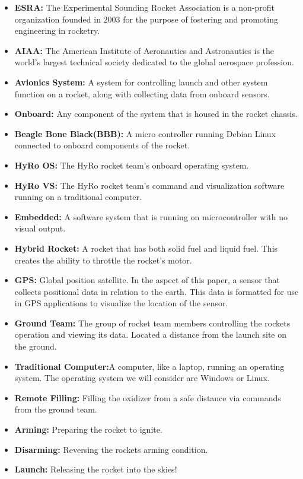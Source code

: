 \documentclass[10pt,draftclsnofoot,onecolumn,compsoc]{IEEEtran}
\begin{document}
\begin{itemize}
\item{\bf ESRA:}  The Experimental Sounding Rocket Association is a non-profit organization founded in 2003 for the purpose of fostering and promoting engineering in rocketry.
\item{\bf AIAA:} The American Institute of Aeronautics and Astronautics is the world's largest technical society dedicated to the global aerospace profession.
\item{\bf Avionics System:}  A system for controlling launch and other system function on a rocket, along with collecting data from onboard sensors.
\item{\bf Onboard:} Any component of the system that is housed in the rocket chassis.
\item{\bf Beagle Bone Black(BBB):}   A micro controller running Debian Linux connected to onboard components of the rocket.
\item{\bf HyRo OS:}  The HyRo rocket team's onboard operating system.
\item{\bf HyRo VS:} The HyRo rocket team's command and visualization software running on a traditional computer.
\item{\bf Embedded:} A software system that is running on microcontroller with no visual output.
\item{\bf Hybrid Rocket:} A rocket that has both solid fuel and liquid fuel. This creates the ability to throttle the rocket's motor.
\item{\bf GPS:} Global position satellite. In the aspect of this paper, a sensor that collects positional data in relation to the earth. This data is formatted for use in GPS applications to visualize the location of the sensor.
\item{\bf Ground Team:} The group of rocket team members controlling the rockets operation and viewing its data. Located a distance from the launch site on the ground.
\item{\bf Traditional Computer:}A computer, like a laptop, running an operating system. The operating system we will consider are Windows or Linux.
\item{\bf Remote Filling:} Filling the oxidizer from a safe distance via commands from the ground team.
\item{\bf Arming:} Preparing the rocket to ignite.
\item{\bf Disarming:} Reversing the rockets arming condition. 
\item{\bf Launch:} Releasing the rocket into the skies! 

\end{itemize}
\end{document}
